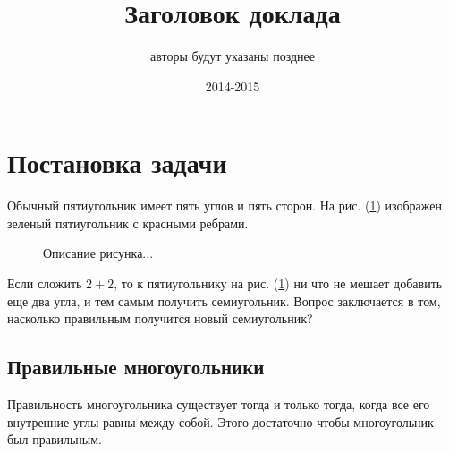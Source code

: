 \documentclass[12pt]{article}
\title{Заголовок доклада}
\author{авторы будут указаны позднее}
\date{2014-2015}
\begin{document}
    \maketitle
    \tableofcontents
    \newpage
    \begin{abstract}
         
    \end{abstract}
    \section{Постановка задачи}
    Обычный пятиугольник имеет пять углов и пять сторон.    
    На рис. (\ref{fig1}) изображен зеленый пятиугольник с красными ребрами.
    \begin{figure}[h]
    \centering
    \caption{Описание рисунка...}
    \label{fig1}
    \end{figure}
    Если сложить $2+2$, то к пятиугольнику на рис. (\ref{fig1}) ни что
    не мешает добавить еще два угла, и тем самым получить семиугольник.
    Вопрос заключается в том, насколько правильным получится новый
    семиугольник?
    \subsection{Правильные многоугольники}
    Правильность многоугольника существует тогда и только тогда,
    когда все его внутренние углы равны между собой. Этого достаточно
    чтобы многоугольник был правильным.
    
\end{document}
